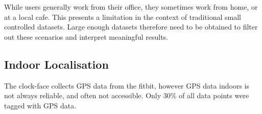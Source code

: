 

While users generally work from their office, they sometimes work from home, or at a local cafe. This presents a limitation in the context of traditional small controlled datasets. Large enough datasets therefore need to be obtained to filter out these scenarios and interpret meaningful results.









\subsection{Indoor Localisation}
\label{ch:localisation}

The clock-face collects GPS data from the fitbit, however GPS data indoors is not always reliable, and often not accessible. Only 30\% of all data points were tagged with GPS data. \

